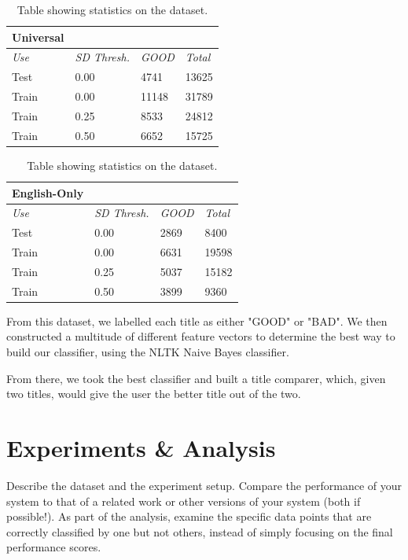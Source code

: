 \documentclass[a4paper,12pt]{article}
\begin{document}
\begin{table}[h]
  \small
  \centering
  \begin{tabular}{|l|l|l|l|}
    \hline
    \textbf{Universal}&&& \\ \hline \hline
    \textit{Use} & \textit{SD Thresh.} & \textit{GOOD} & \textit{Total} \\ \hline 
    Test & 0.00 & 4741 & 13625 \\ \hline
    Train & 0.00 & 11148 & 31789 \\ \hline
    Train & 0.25 & 8533 & 24812 \\ \hline
    Train & 0.50 & 6652 & 15725 \\ \hline
  \end{tabular}
  \quad
  \begin{tabular}{|l||l|l|l|}
    \hline
    \textbf{English-Only}&&& \\ \hline \hline
    \textit{Use} & \textit{SD Thresh.} & \textit{GOOD} & \textit{Total} \\ \hline 
    Test & 0.00 & 2869 & 8400 \\ \hline
    Train & 0.00 & 6631 & 19598 \\ \hline
    Train & 0.25 & 5037 & 15182 \\ \hline
    Train & 0.50 & 3899 & 9360 \\ \hline
  \end{tabular}

  \caption{Table showing statistics on the dataset.}
  \label{table:dataset-stats}
\end{table}

From this dataset, we labelled each title as either "GOOD" or "BAD". We then constructed a multitude of different feature vectors to determine the best way to build our classifier, using the NLTK Naive Bayes classifier. 

From there, we took the best classifier and built a title comparer, which, given two titles, would give the user the better title out of the two. 


\section{Experiments \& Analysis}

Describe the dataset and the experiment setup. Compare the
performance of your system to that of a related work or other versions of your system (both if
possible!). As part of the analysis, examine the specific data points that are correctly classified by
one but not others, instead of simply focusing on the final performance scores.
\end{document}
